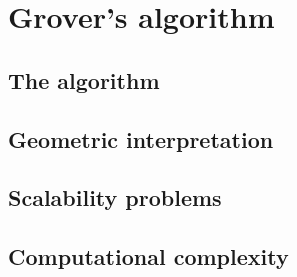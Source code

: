 \chapter{Grover's algorithm}
\section{The algorithm}
\section{Geometric interpretation}
\section{Scalability problems}
\section{Computational complexity}